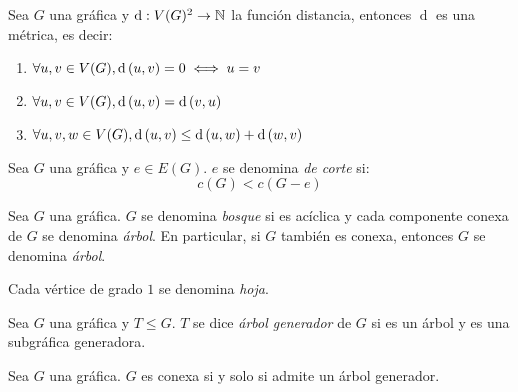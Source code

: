 \begin{theorem}
	Sea $G$ una gráfica y $\operatorname{d}: V(G)^{2}\to\mathbb{N}^{}$ la función distancia, entonces $\operatorname{d}$ es una métrica, es decir:
	\begin{enumerate}
		\item $\forall u, v\in V(G), \operatorname{d}\left( u, v \right) = 0\iff u = v$
		\item $\forall u, v\in V(G), \operatorname{d}\left( u, v \right) =\operatorname{d}\left( v, u \right)$
		\item $\forall u, v, w\in V(G), \operatorname{d}\left( u, v \right)\leq\operatorname{d}\left( u, w \right) +\operatorname{d}\left( w, v \right)$
	\end{enumerate}
\end{theorem}
\begin{definition}
	Sea $G$ una gráfica y $e\in E(G)$. $e$ se denomina \emph{de corte} si:
	\[ c(G) < c(G - e) \]
\end{definition}
\begin{figure}[H]
	\centering
\end{figure}
\begin{definition}
	Sea $G$ una gráfica. $G$ se denomina \emph{bosque} si es acíclica y cada componente conexa de $G$ se denomina \emph{árbol}. En particular, si $G$ también es conexa, entonces $G$ se denomina \emph{árbol}.\par 
	Cada vértice de grado $1$ se denomina \emph{hoja}.
\end{definition}
\begin{figure}[H]
	\centering
\end{figure}
\begin{definition}
	Sea $G$ una gráfica y $T\leq G$. $T$ se dice \emph{árbol generador } de $G$ si es un árbol y es una subgráfica generadora.
\end{definition}
\begin{theorem}
	Sea $G$ una gráfica. $G$ es conexa si y solo si admite un árbol generador.
\end{theorem}

